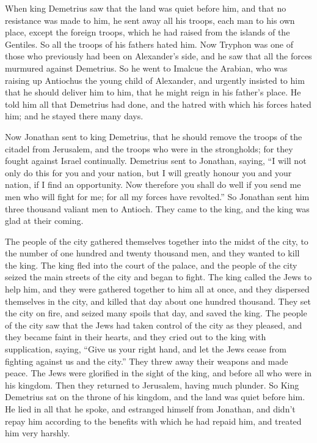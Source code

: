  When king Demetrius saw that the land was quiet before
him, and that no resistance was made to him, he sent away all his
troops, each man to his own place, except the foreign troops, which he
had raised from the islands of the Gentiles. So all the troops of his
fathers hated him.  Now Tryphon was one of those who
previously had been on Alexander's side, and he saw that all the forces
murmured against Demetrius. So he went to Imalcue the Arabian, who was
raising up Antiochus the young child of Alexander,  and
urgently insisted to him that he should deliver him to him, that he
might reign in his father's place. He told him all that Demetrius had
done, and the hatred with which his forces hated him; and he stayed
there many days.

 Now Jonathan sent to king Demetrius, that he should remove
the troops of the citadel from Jerusalem, and the troops who were in the
strongholds; for they fought against Israel continually. 
Demetrius sent to Jonathan, saying, ``I will not only do this for you
and your nation, but I will greatly honour you and your nation, if I
find an opportunity.  Now therefore you shall do well if
you send me men who will fight for me; for all my forces have
revolted.''  So Jonathan sent him three thousand valiant
men to Antioch. They came to the king, and the king was glad at their
coming.

 The people of the city gathered themselves together into
the midst of the city, to the number of one hundred and twenty thousand
men, and they wanted to kill the king.  The king fled into
the court of the palace, and the people of the city seized the main
streets of the city and began to fight.  The king called
the Jews to help him, and they were gathered together to him all at
once, and they dispersed themselves in the city, and killed that day
about one hundred thousand.  They set the city on fire, and
seized many spoils that day, and saved the king.  The
people of the city saw that the Jews had taken control of the city as
they pleased, and they became faint in their hearts, and they cried out
to the king with supplication, saying,  ``Give us your
right hand, and let the Jews cease from fighting against us and the
city.''  They threw away their weapons and made peace. The
Jews were glorified in the sight of the king, and before all who were in
his kingdom. Then they returned to Jerusalem, having much plunder.
 So King Demetrius sat on the throne of his kingdom, and
the land was quiet before him.  He lied in all that he
spoke, and estranged himself from Jonathan, and didn't repay him
according to the benefits with which he had repaid him, and treated him
very harshly.

